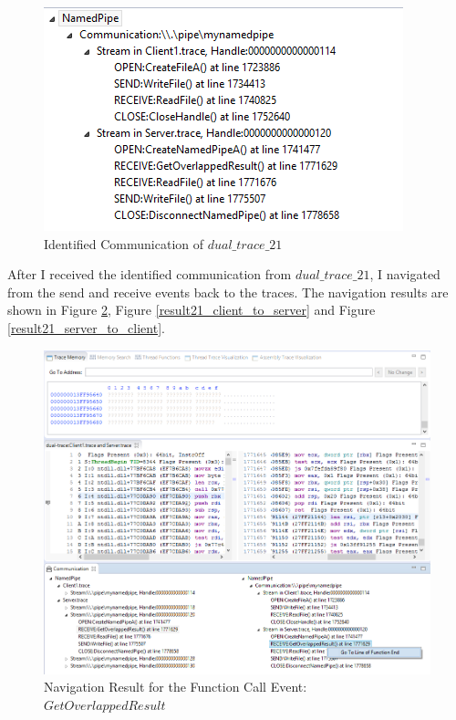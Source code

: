 \begin{figure}[H]
\centerline{\includegraphics{Figures/result21_communications}}
 \caption{Identified Communication of $dual\_trace\_21$}
\label{result21_communications}
\end{figure}

After I received the identified communication from $dual\_trace\_21$, I navigated from the send and receive events back to the traces. The navigation results are shown in Figure \ref{result21_server_readnull},  Figure \ref{result21_client_to_server} and Figure \ref{result21_server_to_client}.

\begin{figure}[H]
\centerline{\includegraphics[scale=0.35]{Figures/result21_server_readnull}}
 \caption{Navigation Result for the Function Call Event: $GetOverlappedResult$}
\label{result21_server_readnull}
\end{figure}

